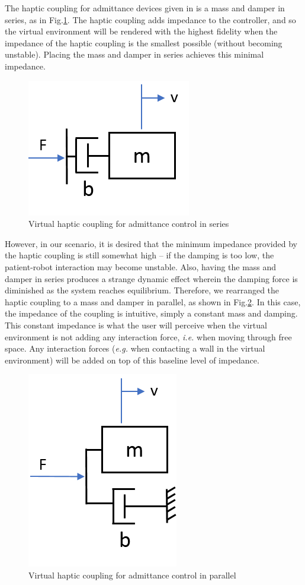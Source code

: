 \documentclass[12pt]{report}
\begin{document}
The haptic coupling for admittance devices given in \cite{Adams1999} is a mass and damper in series, as in Fig.\ref{fig:haptic_coupling_original}. The haptic coupling adds impedance to the controller, and so the virtual environment will be rendered with the highest fidelity when the impedance of the haptic coupling is the smallest possible (without becoming unstable). Placing the mass and damper in series achieves this minimal impedance.  	

	
	\begin{figure}[h] 
	\centering
\includegraphics[width=0.3\linewidth]{haptic_coupling_original}
		\caption{Virtual haptic coupling for admittance control in series}
		\label{fig:haptic_coupling_original}
	\end{figure} 
	
	However, in our scenario, it is desired that the minimum impedance provided by the haptic coupling is still somewhat high -- if the damping is too low, the patient-robot interaction may become unstable. Also, having the mass and damper in series produces a strange dynamic effect wherein the damping force is diminished as the system reaches equilibrium. Therefore, we rearranged the haptic coupling to a mass and damper in parallel, as shown in Fig.\ref{fig:haptic_coupling}. In this case, the impedance of the coupling is intuitive, simply a constant mass and damping. This constant impedance is what the user will perceive when the virtual environment is not adding any interaction force, \textit{i.e.} when moving through free space. Any interaction forces (\textit{e.g.} when contacting a wall in the virtual environment) will be added on top of this baseline level of impedance. 
	
	\begin{figure}[h] 
		\centering
		\includegraphics[width=0.3\linewidth]{haptic_coupling}
		\caption{Virtual haptic coupling for admittance control in parallel}
		\label{fig:haptic_coupling}
	\end{figure} 
\end{document}
